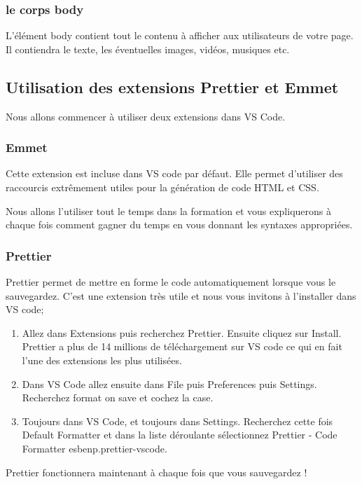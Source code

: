 \documentclass[a4paper]{article}
\begin{document}
\subsubsection{le corps {\color{monOrange}body}}
L'élément {\color{monOrange}body} contient tout le contenu à afficher aux utilisateurs de votre page. Il contiendra le texte, les éventuelles images, vidéos, musiques etc.

\subsection{Utilisation des extensions {\color{monOrange}Prettier} et {\color{monOrange}Emmet}}
Nous allons commencer à utiliser deux extensions dans {\color{monOrange}VS Code}.

\subsubsection{{\color{monOrange}Emmet}}
Cette extension est incluse dans {\color{monOrange}VS code} par défaut. Elle permet d'utiliser des raccourcis extrêmement utiles pour la génération de code {\color{monOrange}HTML} et {\color{monOrange}CSS}.

Nous allons l'utiliser tout le temps dans la formation et vous expliquerons à chaque fois comment gagner du temps en vous donnant les syntaxes appropriées.

\subsubsection{{\color{monOrange}Prettier}}
{\color{monOrange}Prettier} permet de mettre en forme le code automatiquement lorsque vous le sauvegardez. C'est une extension très utile et nous vous invitons à l'installer dans VS code;
\begin{enumerate}
\item Allez dans {\color{monOrange}Extensions} puis recherchez {\color{monOrange}Prettier}. Ensuite cliquez sur {\color{monOrange}Install}. {\color{monOrange}Prettier} a plus de 14 millions de téléchargement sur VS code ce qui en fait l'une des extensions les plus utilisées.

\item Dans {\color{monOrange}VS Code} allez ensuite dans {\color{monOrange}File} puis {\color{monOrange}Preferences} puis {\color{monOrange}Settings}. Recherchez {\color{monOrange}format on save} et cochez la case.

\item Toujours dans {\color{monOrange}VS Code}, et toujours dans {\color{monOrange}Settings}. Recherchez cette fois {\color{monOrange}Default Formatter} et dans la liste déroulante sélectionnez {\color{monOrange}Prettier - Code Formatter esbenp.prettier-vscode}.

\end{enumerate}
{\color{monOrange}Prettier} fonctionnera maintenant à chaque fois que vous sauvegardez !
\end{document}
